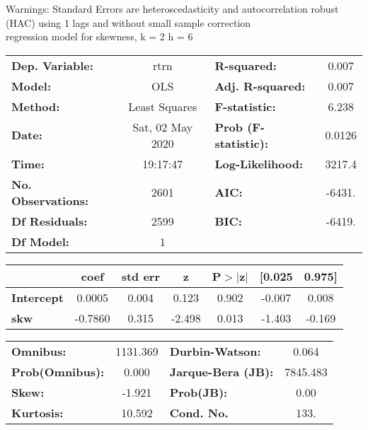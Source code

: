 Warnings: \newline
 [1] Standard Errors are heteroscedasticity and autocorrelation robust (HAC) using 1 lags and without small sample correction\\ 

regression model for skewness, k = 2 h = 6\begin{center}
\begin{tabular}{lclc}
\toprule
\textbf{Dep. Variable:}    &       rtrn       & \textbf{  R-squared:         } &     0.007   \\
\textbf{Model:}            &       OLS        & \textbf{  Adj. R-squared:    } &     0.007   \\
\textbf{Method:}           &  Least Squares   & \textbf{  F-statistic:       } &     6.238   \\
\textbf{Date:}             & Sat, 02 May 2020 & \textbf{  Prob (F-statistic):} &   0.0126    \\
\textbf{Time:}             &     19:17:47     & \textbf{  Log-Likelihood:    } &    3217.4   \\
\textbf{No. Observations:} &        2601      & \textbf{  AIC:               } &    -6431.   \\
\textbf{Df Residuals:}     &        2599      & \textbf{  BIC:               } &    -6419.   \\
\textbf{Df Model:}         &           1      & \textbf{                     } &             \\
\bottomrule
\end{tabular}
\begin{tabular}{lcccccc}
                   & \textbf{coef} & \textbf{std err} & \textbf{z} & \textbf{P$> |$z$|$} & \textbf{[0.025} & \textbf{0.975]}  \\
\midrule
\textbf{Intercept} &       0.0005  &        0.004     &     0.123  &         0.902        &       -0.007    &        0.008     \\
\textbf{skw}       &      -0.7860  &        0.315     &    -2.498  &         0.013        &       -1.403    &       -0.169     \\
\bottomrule
\end{tabular}
\begin{tabular}{lclc}
\textbf{Omnibus:}       & 1131.369 & \textbf{  Durbin-Watson:     } &    0.064  \\
\textbf{Prob(Omnibus):} &   0.000  & \textbf{  Jarque-Bera (JB):  } & 7845.483  \\
\textbf{Skew:}          &  -1.921  & \textbf{  Prob(JB):          } &     0.00  \\
\textbf{Kurtosis:}      &  10.592  & \textbf{  Cond. No.          } &     133.  \\
\bottomrule
\end{tabular}
\end{center}

